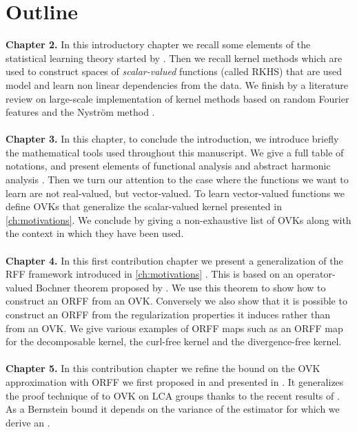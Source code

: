 \section{Outline}
\textbf{Chapter 2.}
In this introductory chapter we recall some elements of the statistical
learning theory started by \citet{Vapnik1998}. Then we recall kernel methods
\citep{Aronszajn1950} which are used to construct spaces of
\emph{scalar-valued} functions (called \acs{RKHS}) that are used model and
learn non linear dependencies from the data. We finish by a literature review
on large-scale implementation of kernel methods based on random Fourier
features \citep{Rahimi2007} and the Nystr\"om method
\citep{Williams2000-nystrom}.
\paragraph{}
\textbf{Chapter 3.}
In this chapter, to conclude the introduction, we introduce briefly the
mathematical tools used throughout this manuscript. We give a full table of
notations, and present elements of functional analysis
\citep{kurdila2006convex} and abstract harmonic analysis
\citep{folland1994course}. Then we turn our attention to the case where the
functions we want to learn are not real-valued, but vector-valued.  To learn
vector-valued functions we define \aclp{OVK} \citep{Micchelli2005, Carmeli2010}
that generalize the scalar-valued kernel presented in \cref{ch:motivations}. We
conclude by giving a non-exhaustive list of \aclp{OVK} along with the context
in which they have been used.

\paragraph{}
\textbf{Chapter 4.}
In this first contribution chapter we present a generalization of the \acs{RFF}
framework introduced in \cref{ch:motivations} \citep{brault2016random}. This is
based on an operator-valued Bochner theorem proposed by \citet{Carmeli2010}. We
use this theorem to show how to construct an \acf{ORFF} from an \acs{OVK}.
Conversely we also show that it is possible to construct an \acs{ORFF} from the
regularization properties it induces rather than from an \acs{OVK}. We give
various examples of \acs{ORFF} maps such as an \acs{ORFF} map for the
decomposable kernel, the curl-free kernel and the divergence-free kernel.

\paragraph{}
\textbf{Chapter 5.} 
In this contribution chapter we refine the bound on the \ac{OVK} approximation
with \ac{ORFF} we first proposed in \cite{brault2016random} and presented in
\cite{braultborne}. It generalizes the proof technique of \citet{Rahimi2007} to
\ac{OVK} on \ac{LCA} groups thanks to the recent results of
\citet{sutherland2015, tropp2015introduction, minsker2011some,
koltchinskii2013remark}. As a Bernstein bound it depends on the variance of the
estimator for which we derive an .


